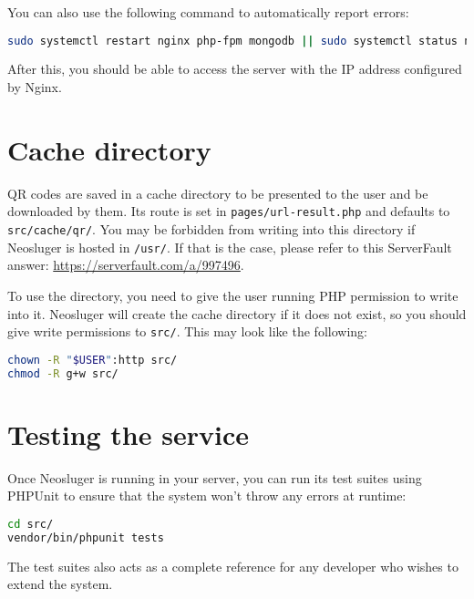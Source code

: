 You can also use the following command to automatically report errors:

\begin{lstlisting}[language=sh]
sudo systemctl restart nginx php-fpm mongodb || sudo systemctl status nginx
\end{lstlisting}

After this, you should be able to access the server with the IP address configured by Nginx.

\section{Cache directory}\label{cache-directory}

QR codes are saved in a cache directory to be presented to the user and be downloaded by them.
Its route is set in \texttt{pages/url-result.php} and defaults to \texttt{src/cache/qr/}.
You may be forbidden from writing into this directory if Neosluger is hosted in \texttt{/usr/}.
If that is the case, please refer to this ServerFault answer: \url{https://serverfault.com/a/997496}.

To use the directory, you need to give the user running PHP permission to write into it.
Neosluger will create the cache directory if it does not exist, so you should give write permissions to \texttt{src/}.
This may look like the following:

\begin{lstlisting}[language=sh]
chown -R "$USER":http src/
chmod -R g+w src/
\end{lstlisting}

\section{Testing the service}\label{testing-the-service}

Once Neosluger is running in your server, you can run its test suites using PHPUnit to ensure that the system won't throw any errors at runtime:

\begin{lstlisting}[language=sh]
cd src/
vendor/bin/phpunit tests
\end{lstlisting}

The test suites also acts as a complete reference for any developer who wishes to extend the system.
